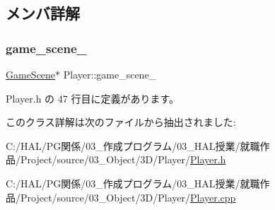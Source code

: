 \subsection{メンバ詳解}
\mbox{\label{class_player_ab41e7ebf6f975f2eea365923bc2dca7f}} 
\subsubsection{\texorpdfstring{game\+\_\+scene\+\_\+}{game\_scene\_}}
{\footnotesize\ttfamily \mbox{\hyperlink{class_game_scene}{Game\+Scene}}$\ast$ Player\+::game\+\_\+scene\+\_\+}



 Player.\+h の 47 行目に定義があります。



このクラス詳解は次のファイルから抽出されました\+:\begin{DoxyCompactItemize}
\item 
C\+:/\+H\+A\+L/\+P\+G関係/03\+\_\+作成プログラム/03\+\_\+\+H\+A\+L授業/就職作品/\+Project/source/03\+\_\+\+Object/3\+D/\+Player/\mbox{\hyperlink{_player_8h}{Player.\+h}}\item 
C\+:/\+H\+A\+L/\+P\+G関係/03\+\_\+作成プログラム/03\+\_\+\+H\+A\+L授業/就職作品/\+Project/source/03\+\_\+\+Object/3\+D/\+Player/\mbox{\hyperlink{_player_8cpp}{Player.\+cpp}}\end{DoxyCompactItemize}
